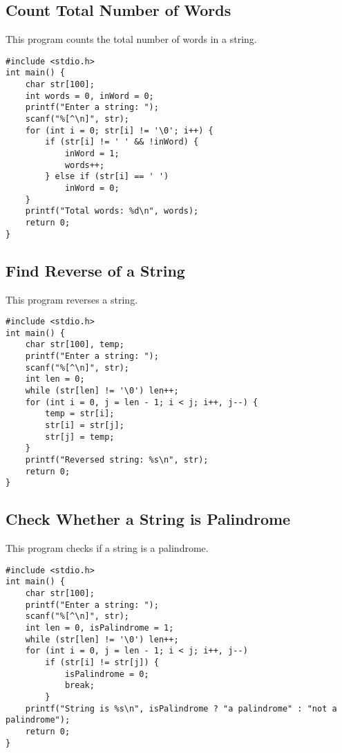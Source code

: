 \documentclass[a4paper,12pt]{article}
\begin{document}
\subsection{Count Total Number of Words}
This program counts the total number of words in a string.
\begin{lstlisting}[caption={Count Total Number of Words}]
#include <stdio.h>
int main() {
    char str[100];
    int words = 0, inWord = 0;
    printf("Enter a string: ");
    scanf("%[^\n]", str);
    for (int i = 0; str[i] != '\0'; i++) {
        if (str[i] != ' ' && !inWord) {
            inWord = 1;
            words++;
        } else if (str[i] == ' ')
            inWord = 0;
    }
    printf("Total words: %d\n", words);
    return 0;
}
\end{lstlisting}
\clearpage

\subsection{Find Reverse of a String}
This program reverses a string.
\begin{lstlisting}[caption={Find Reverse of a String}]
#include <stdio.h>
int main() {
    char str[100], temp;
    printf("Enter a string: ");
    scanf("%[^\n]", str);
    int len = 0;
    while (str[len] != '\0') len++;
    for (int i = 0, j = len - 1; i < j; i++, j--) {
        temp = str[i];
        str[i] = str[j];
        str[j] = temp;
    }
    printf("Reversed string: %s\n", str);
    return 0;
}
\end{lstlisting}
\clearpage

\subsection{Check Whether a String is Palindrome}
This program checks if a string is a palindrome.
\begin{lstlisting}[caption={Check Whether a String is Palindrome}]
#include <stdio.h>
int main() {
    char str[100];
    printf("Enter a string: ");
    scanf("%[^\n]", str);
    int len = 0, isPalindrome = 1;
    while (str[len] != '\0') len++;
    for (int i = 0, j = len - 1; i < j; i++, j--)
        if (str[i] != str[j]) {
            isPalindrome = 0;
            break;
        }
    printf("String is %s\n", isPalindrome ? "a palindrome" : "not a palindrome");
    return 0;
}
\end{lstlisting}
\clearpage
\end{document}
